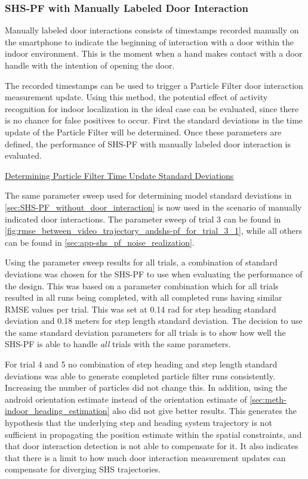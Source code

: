 \subsubsection{SHS-PF with Manually Labeled Door Interaction}
\label{sec:results-SHS_PF_manually indicated}

Manually labeled door interactions consists of timestamps recorded manually on the smartphone to indicate the beginning of interaction with a door within the indoor environment. This is the moment when a hand makes contact with a door handle with the intention of opening the door. \par 

The recorded timestamps can be used to trigger a Particle Filter door interaction measurement update. Using this method, the potential effect of activity recognition for indoor localization in the ideal case can be evaluated, since there is no chance for false positives to occur.
First the standard deviations in the time update of the Particle Filter will be determined. Once these parameters are defined, the performance of SHS-PF with manually labeled door interaction is evaluated.

\underline{Determining Particle Filter Time Update Standard Deviations}

The same parameter sweep used for determining model standard deviations in \cref{sec:SHS-PF_without_door_interaction} is now used in the scenario of manually indicated door interactions. The parameter sweep of trial 3 can be found in \cref{fig:rmse_between_video_trajectory_andshs-pf_for_trial_3_1}, while all others can be found in \cref{sec:app-shs_pf_noise_realization}. \par
 
Using the parameter sweep results for all trials, a combination of standard deviations was chosen for the SHS-PF to use when evaluating the performance of the design. This was based on a parameter combination which for all trials resulted in all runs being completed, with all completed runs having similar RMSE values per trial. This was set at 0.14 rad for step heading standard deviation and 0.18 meters for step length standard deviation. The decision to use the same standard deviation parameters for all trials is to show how well the SHS-PF is able to handle \textit{all} trials with the same parameters.  \par 

For trial 4 and 5 no combination of step heading and step length standard deviations was able to generate completed particle filter runs consistently. Increasing the number of particles did not change this. In addition, using the android orientation estimate instead of the orientation estimate of \cref{sec:meth-indoor_heading_estimation} also did not give better results. This generates the hypothesis that the underlying step and heading system trajectory is not sufficient in propagating the position estimate within the spatial constraints, and that door interaction detection is not able to compensate for it. It also indicates that there is a limit to how much door interaction measurement updates can compensate for diverging SHS trajectories.  \par

